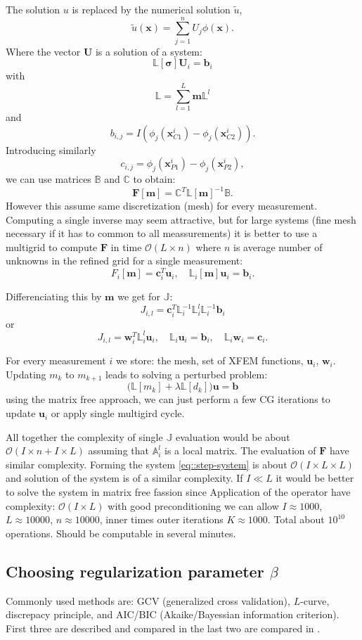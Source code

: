 \documentclass[a4paper, 12pt]{book}
\theoremstyle{definition}
\def\vc#1{\mathbf{\boldsymbol{#1}}}     %
\def\tn#1{{\mathbb{#1}}}    %
\begin{document}
The solution $u$ is replaced by the numerical solution $\tilde u$,
\[
    \tilde u(\vc x) = \sum_{j=1}^n U_j \phi(\vc x).
\]
Where the vector $\vc U$ is a solution of a system:
\[
    \tn L[\vc \sigma] \vc U_i = \vc b_i
\]
with
\[
    \tn L = \sum_{l=1}^L \vc m \tn L^l 
\]
and
\[
    b_{i,j} = I(\phi_j(\vc x^i_{C1}) - \phi_j(\vc x^i_{C2})).
\]
Introducing similarly
\[
 c_{i,j} = \phi_j(\vc x^i_{P1}) - \phi_j(\vc x^i_{P2}),
\]
we can use matrices $\tn B$ and $\tn C$ to obtain:
\[
    \vc F[\vc m] = \tn C^T \tn L[\vc m]^{-1} \tn B.
\]
However this assume same discretization (mesh) for every measurement. Computing a single inverse 
may seem attractive, but for large systems (fine mesh necessary if it has to common to all meassurements)
it is better to use a multigrid to compute $\vc F$ in time $\mathcal O(L\times n)$ where $n$ is average number of unknowns 
in the refined grid for a single measurement:
\[
    F_i[\vc m] = \vc c_i^T \vc u_i, \quad \tn L_i[\vc m]\vc u_i =  \vc b_i.
\]

Differenciating this by $\vc m$ we get for $\tn J$:
\[
    J_{i,l} = \vc c_i^T \tn L_i^{-1} \tn L_i^l \tn L_i^{-1} \vc b_i
\]
or
\[
    J_{i,l} = \vc w_i^T \tn L_i^l \vc u_i, \quad \tn L_i \vc u_i = \vc b_i, \quad \tn L_i \vc w_i = \vc c_i.
\]

For every measurement $i$ we store: the mesh, set of XFEM functions, $\vc u_{i}$, $\vc w_{i}$. Updating $m_k$ to $m_{k+1}$
leads to solving a perturbed problem:
\[
   \Big(\tn L[m_k] + \lambda \tn L[d_k]\Big) \vc u = \vc b
\]
using the matrix free approach, we can just perform a few CG iterations to update $\vc u_i$ or apply single multigird cycle.

All together the complexity of single  $\tn J$ evaluation would be about 
$\mathcal O(I \times n + I \times L)$ assuming that $\tn A_i^l$ is a local matrix. The evaluation of $\vc F$ have similar complexity.
Forming the system \eqref{eq::step-system} is about $\mathcal O(I \times L \times L)$ and solution of the system is of a similar complexity.
If $I \ll L$ it would be better to solve the system in matrix free fassion since Application of the operator have complexity:
$\mathcal O(I \times L)$ with good preconditioning we can allow $I \approx 1000$, $L\approx 10000$, $n\approx 10000$, inner times outer iterations $K\approx 1000$.
Total about $10^10$ operations. Should be computable in several minutes.

\subsection{Choosing regularization parameter $\beta$}
\label{sec:beta_choice}
Commonly used methods are: GCV (generalized cross validation), $L$-curve, discrepacy principle, 
and AIC/BIC (Akaike/Bayessian information criterion). First three are described and compared in \cite{farquharson_2004}
the last two are compared in \cite{burnham_2004}.
\end{document}

